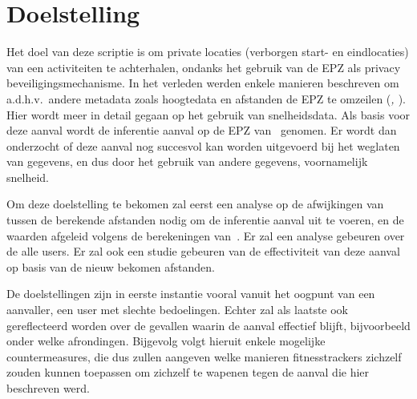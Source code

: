\section{Doelstelling}
Het doel van deze scriptie is om private locaties (verborgen start- en
eindlocaties) van een activiteiten te achterhalen, ondanks het gebruik van de
EPZ als privacy beveiligingsmechanisme. In het verleden werden enkele manieren
beschreven om a.d.h.v.\ andere metadata zoals hoogtedata en afstanden de EPZ te
omzeilen (\textit{\citeauthor{Dhondt_Pochat_Voulimeneas_Joosen_Volckaert_2022},
    \citeauthor{Verdonck_2022}}). Hier wordt meer in detail gegaan op het gebruik
van snelheidsdata. Als basis voor deze aanval wordt de inferentie aanval op de
EPZ van~\citeauthor{Dhondt_Pochat_Voulimeneas_Joosen_Volckaert_2022} genomen.
Er wordt dan onderzocht of deze aanval nog succesvol kan worden uitgevoerd bij
het weglaten van gegevens, en dus door het gebruik van andere gegevens,
voornamelijk snelheid.

Om deze doelstelling te bekomen zal eerst een analyse op de afwijkingen van
tussen de berekende afstanden nodig om de inferentie aanval uit te voeren, en
de waarden afgeleid volgens de berekeningen
van~\citeauthor{Dhondt_Pochat_Voulimeneas_Joosen_Volckaert_2022}. Er zal een
analyse gebeuren over de alle users. Er zal ook een studie gebeuren van de
effectiviteit van deze aanval op basis van de nieuw bekomen afstanden.

De doelstellingen zijn in eerste instantie vooral vanuit het oogpunt van een
aanvaller, een user met slechte bedoelingen. Echter zal als laatste ook
gereflecteerd worden over de gevallen waarin de aanval effectief blijft,
bijvoorbeeld onder welke afrondingen. Bijgevolg volgt hieruit enkele mogelijke
countermeasures, die dus zullen aangeven welke manieren fitnesstrackers
zichzelf zouden kunnen toepassen om zichzelf te wapenen tegen de aanval die
hier beschreven werd.